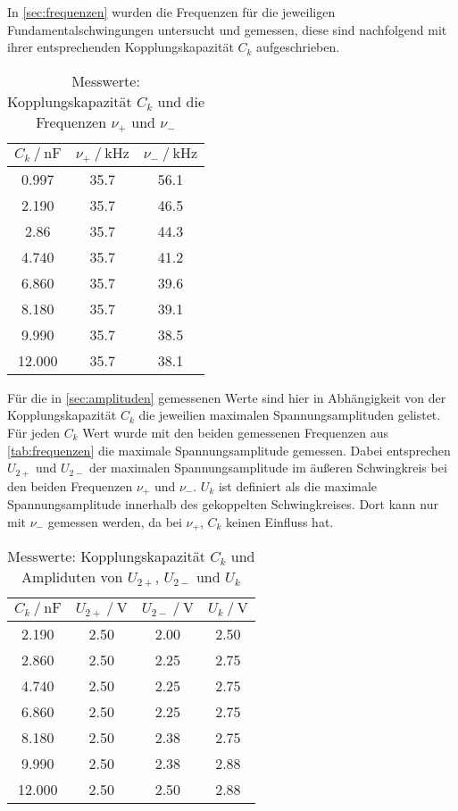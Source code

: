 In \autoref{sec:frequenzen} wurden die Frequenzen für die jeweiligen Fundamentalschwingungen untersucht und gemessen, diese sind nachfolgend mit ihrer entsprechenden Kopplungskapazität $C_k$ aufgeschrieben.

\begin{table}
  \centering
  \caption{Messwerte: Kopplungskapazität $C_k $ und die Frequenzen $\nu _+$ und $\nu _-$}
  \label{tab:frequenzen}
  \begin{tabular}{c c c}
    \toprule 
    $C_k \:/\: \si{\nano\farad}$ & $\nu _+ \:/\: \si{\kilo\hertz}$ & $\nu _- \:/\: \si{\kilo\hertz}$   \\ 
    \midrule 
    0.997 & 35.7 & 56.1 \\
    2.190 & 35.7 & 46.5 \\
    2.86 & 35.7 & 44.3 \\
    4.740 & 35.7 & 41.2 \\
    6.860 & 35.7 & 39.6 \\
    8.180 & 35.7 & 39.1 \\
    9.990 & 35.7 & 38.5 \\
    12.000 & 35.7 & 38.1 \\
    \bottomrule
  \end{tabular}
\end{table}

Für die in \autoref{sec:amplituden} gemessenen Werte sind hier in Abhängigkeit von der Kopplungskapazität $C_k$ die jeweilien maximalen Spannungsamplituden gelistet. Für jeden $C_k$ Wert wurde mit den beiden gemessenen Frequenzen aus \autoref{tab:frequenzen} die maximale Spannungsamplitude gemessen. Dabei entsprechen $U_{2+}$ und $U_{2-}$ der maximalen Spannungsamplitude im äußeren Schwingkreis bei den beiden Frequenzen $\nu _+$ und $\nu _-$. $U_k$ ist definiert als die maximale Spannungsamplitude innerhalb des gekoppelten Schwingkreises. Dort kann nur mit $\nu _-$ gemessen werden, da bei $\nu _+$, $C_k$ keinen Einfluss hat.

\begin{table}
  \centering
  \caption{Messwerte: Kopplungskapazität $C_k $ und Ampliduten von $U_{2+}$, $U_{2-}$ und $U_k$}
  \label{tab:amplituden}
  \begin{tabular}{c c c c}
    \toprule 
    $C_k \:/\: \si{\nano\farad}$ & $U_{2+} \:/\: \si{\volt}$ & $U_{2-} \:/\: \si{\volt}$ &  $U_k \:/\: \si{\volt}$       \\ 
    \midrule 
    2.190 & 2.50 & 2.00 & 2.50 \\
    2.860 & 2.50 & 2.25 & 2.75 \\
    4.740 & 2.50 & 2.25 & 2.75 \\
    6.860 & 2.50 & 2.25 & 2.75 \\
    8.180 & 2.50 & 2.38 & 2.75 \\
    9.990 & 2.50 & 2.38 & 2.88 \\
    12.000 & 2.50 & 2.50 & 2.88 \\
    \bottomrule
  \end{tabular}
\end{table}

